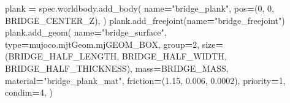 \documentclass[
  american,
  11pt,
  letterpaper,
]{article}
\newenvironment{Shaded}{\begin{snugshade}}{\end{snugshade}}
\newcommand{\BuiltInTok}[1]{#1}
\newcommand{\DecValTok}[1]{\textcolor[rgb]{0.00,0.00,0.81}{#1}}
\newcommand{\FloatTok}[1]{\textcolor[rgb]{0.00,0.00,0.81}{#1}}
\newcommand{\NormalTok}[1]{#1}
\newcommand{\OperatorTok}[1]{\textcolor[rgb]{0.81,0.36,0.00}{\textbf{#1}}}
\newcommand{\StringTok}[1]{\textcolor[rgb]{0.31,0.60,0.02}{#1}}
\renewenvironment{Shaded}{\par\smallskip}{\par\smallskip}
\begin{document}
\begin{Shaded}
\begin{Highlighting}[]
\NormalTok{    plank }\OperatorTok{=}\NormalTok{ spec.worldbody.add\_body(}
\NormalTok{        name}\OperatorTok{=}\StringTok{"bridge\_plank"}\NormalTok{,}
\NormalTok{        pos}\OperatorTok{=}\NormalTok{(}\DecValTok{0}\NormalTok{, }\DecValTok{0}\NormalTok{, BRIDGE\_CENTER\_Z),}
\NormalTok{    )}
\NormalTok{    plank.add\_freejoint(name}\OperatorTok{=}\StringTok{"bridge\_freejoint"}\NormalTok{)}
\NormalTok{    plank.add\_geom(}
\NormalTok{        name}\OperatorTok{=}\StringTok{"bridge\_surface"}\NormalTok{,}
        \BuiltInTok{type}\OperatorTok{=}\NormalTok{mujoco.mjtGeom.mjGEOM\_BOX,}
\NormalTok{        group}\OperatorTok{=}\DecValTok{2}\NormalTok{,}
\NormalTok{        size}\OperatorTok{=}\NormalTok{(BRIDGE\_HALF\_LENGTH, BRIDGE\_HALF\_WIDTH, BRIDGE\_HALF\_THICKNESS),}
\NormalTok{        mass}\OperatorTok{=}\NormalTok{BRIDGE\_MASS,}
\NormalTok{        material}\OperatorTok{=}\StringTok{"bridge\_plank\_mat"}\NormalTok{,}
\NormalTok{        friction}\OperatorTok{=}\NormalTok{(}\FloatTok{1.15}\NormalTok{, }\FloatTok{0.006}\NormalTok{, }\FloatTok{0.0002}\NormalTok{),}
\NormalTok{        priority}\OperatorTok{=}\DecValTok{1}\NormalTok{,}
\NormalTok{        condim}\OperatorTok{=}\DecValTok{4}\NormalTok{,}
\NormalTok{    )}


\end{Highlighting}
\end{Shaded}
\end{document}
